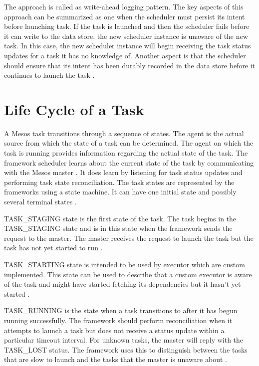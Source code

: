 \documentclass[9pt,twocolumn,twoside]{../../styles/osajnl}
\begin{document}
\begin{itemize}
   The approach is called as write-ahead logging pattern. The key
   aspects of this approach can be summarized as one when the
   scheduler must persist its intent before launching task. If the
   task is launched and then the scheduler fails before it can write
   to the data store, the new scheduler instance is unaware of the
   new task. In this case, the new scheduler instance will begin
   receiving the task status updates for a task it has no
   knowledge of. Another aspect is that the scheduler should ensure that
   its intent has been durably recorded in the data store before it
   continues to launch the task \cite{www-mesos-frmwrk}.
\end{itemize}

\section{Life Cycle of a Task}
A Mesos task transitions through a sequence of states. The agent is
the actual source from which the state of a task can be
determined. The agent on which the task is running provides
information regarding the actual state of the task. The framework
scheduler learns about the current state of the task by communicating
with the Mesos master \cite{www-mesos-arch}. It does learn by
listening for task status updates and performing task state
reconciliation.  The task states are represented by the frameworks
using a state machine. It can have one initial state and possibly
several terminal states \cite{www-mesos-frmwrk}.

TASK\_STAGING state is the first state of the task. The task begins in
the TASK\_STAGING state and is in this state when the framework sends
the request to the master. The master receives the request to launch
the task but the task has not yet started to run
\cite{www-mesos-frmwrk}.

TASK\_STARTING state is intended to be used by executor which are
custom implemented. This state can be used to describe that a custom
executor is aware of the task and might have started fetching its
dependencies but it hasn't yet started \cite{www-mesos-frmwrk}.

TASK\_RUNNING is the state when a task transitions to after it has
begun running successfully. The framework should perform
reconciliation when it attempts to launch a task but does not receive
a status update within a particular timeout interval. For unknown
tasks, the master will reply with the TASK\_LOST status. The framework
uses this to distinguish between the tasks that are slow to launch and
the tasks that the master is unaware about \cite{www-mesos-frmwrk}.
\end{document}
